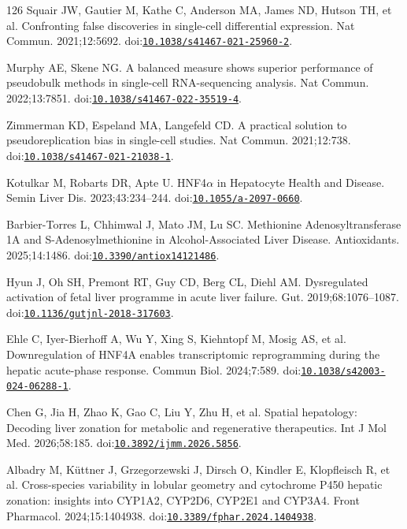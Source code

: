 \begin{thebibliography}{126}
Squair JW, Gautier M, Kathe C, Anderson MA, James ND, Hutson TH, et al. Confronting false discoveries in single-cell differential expression. Nat Commun. 2021;12:5692. doi:\href{https://doi.org/10.1038/s41467-021-25960-2}{\nolinkurl{10.1038/s41467-021-25960-2}}.

Murphy AE, Skene NG. A balanced measure shows superior performance of pseudobulk methods in single-cell RNA-sequencing analysis. Nat Commun. 2022;13:7851. doi:\href{https://doi.org/10.1038/s41467-022-35519-4}{\nolinkurl{10.1038/s41467-022-35519-4}}.

Zimmerman KD, Espeland MA, Langefeld CD. A practical solution to pseudoreplication bias in single-cell studies. Nat Commun. 2021;12:738. doi:\href{https://doi.org/10.1038/s41467-021-21038-1}{\nolinkurl{10.1038/s41467-021-21038-1}}.

Kotulkar M, Robarts DR, Apte U. HNF4\ensuremath{\alpha} in Hepatocyte Health and Disease. Semin Liver Dis. 2023;43:234--244. doi:\href{https://doi.org/10.1055/a-2097-0660}{\nolinkurl{10.1055/a-2097-0660}}.

Barbier-Torres L, Chhimwal J, Mato JM, Lu SC. Methionine Adenosyltransferase 1A and S-Adenosylmethionine in Alcohol-Associated Liver Disease. Antioxidants. 2025;14:1486. doi:\href{https://doi.org/10.3390/antiox14121486}{\nolinkurl{10.3390/antiox14121486}}.

Hyun J, Oh SH, Premont RT, Guy CD, Berg CL, Diehl AM. Dysregulated activation of fetal liver programme in acute liver failure. Gut. 2019;68:1076--1087. doi:\href{https://doi.org/10.1136/gutjnl-2018-317603}{\nolinkurl{10.1136/gutjnl-2018-317603}}.

Ehle C, Iyer-Bierhoff A, Wu Y, Xing S, Kiehntopf M, Mosig AS, et al. Downregulation of HNF4A enables transcriptomic reprogramming during the hepatic acute-phase response. Commun Biol. 2024;7:589. doi:\href{https://doi.org/10.1038/s42003-024-06288-1}{\nolinkurl{10.1038/s42003-024-06288-1}}.

Chen G, Jia H, Zhao K, Gao C, Liu Y, Zhu H, et al. Spatial hepatology: Decoding liver zonation for metabolic and regenerative therapeutics. Int J Mol Med. 2026;58:185. doi:\href{https://doi.org/10.3892/ijmm.2026.5856}{\nolinkurl{10.3892/ijmm.2026.5856}}.

Albadry M, Küttner J, Grzegorzewski J, Dirsch O, Kindler E, Klopfleisch R, et al. Cross-species variability in lobular geometry and cytochrome P450 hepatic zonation: insights into CYP1A2, CYP2D6, CYP2E1 and CYP3A4. Front Pharmacol. 2024;15:1404938. doi:\href{https://doi.org/10.3389/fphar.2024.1404938}{\nolinkurl{10.3389/fphar.2024.1404938}}.


\end{thebibliography}
